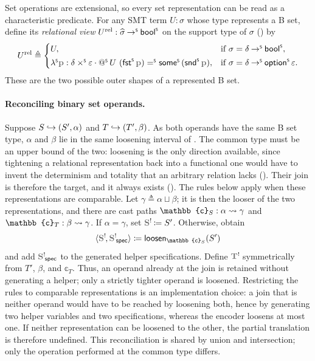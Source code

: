 Set operations are extensional, so every set representation can be read as a characteristic predicate.
For any SMT term \(U : \sigma\) whose type represents a B set, define its \emph{relational view} \(U^{\mathrm{rel}} : \widehat{\sigma}\mathbin{\to^{\scriptscriptstyle{\mathsf{S}}}}\mathsf{bool}^{\scriptscriptstyle{\mathsf{S}}}\) on the support type of \(\sigma\) () by
\[
  U^{\mathrm{rel}}
  \triangleq
  \begin{cases}
    U,
      & \text{if } \sigma=\delta\toS\boolS, \\[2pt]
    \lamS \var{p}:\delta\timesS\varepsilon\cdot
      \appS{U}{(\fstS \var{p})}\eqS\someS(\sndS \var{p}),
      & \text{if } \sigma=\delta\toS\optS\varepsilon.
  \end{cases}
\]
These are the two possible outer shapes of a represented B set.

\paragraph{Reconciling binary set operands.}
Suppose \(S \mathrel{\hookrightarrow} (S', \alpha)\) and \(T \mathrel{\hookrightarrow} (T', \beta)\).
As both operands have the same B set type, \(\alpha\) and \(\beta\) lie in the same loosening interval of .
The common type must be an upper bound of the two: loosening is the only direction available, since tightening a relational representation back into a functional one would have to invent the determinism and totality that an arbitrary relation lacks ().
Their join is therefore the target, and it always exists ().
The rules below apply when these representations are comparable.
Let \(\gamma \triangleq \alpha \sqcup \beta\); it is then the looser of the two representations, and there are cast paths \(\mathbb{c}_S : \castpath{\alpha}{\gamma}\) and \(\mathbb{c}_T : \castpath{\beta}{\gamma}\).
If \(\alpha=\gamma\), set \(\lvar{S}\coloneq S'\).
Otherwise, obtain
\[
  \langle\lvar{S},\spec{\lvar{S}}\rangle
    \coloneq \mathsf{loosen}_{\mathbb{c}_S}(S')
\]
and add \(\spec{\lvar{S}}\) to the generated helper specifications.
Define \(\lvar{T}\) symmetrically from \(T'\), \(\beta\), and \(\mathbb{c}_T\).
Thus, an operand already at the join is retained without generating a helper; only a strictly tighter operand is loosened.
Restricting the rules to comparable representations is an implementation choice: a join that is neither operand would have to be reached by loosening both, hence by generating two helper variables and two specifications, whereas the encoder loosens at most one.
If neither representation can be loosened to the other, the partial translation is therefore undefined.
This reconciliation is shared by union and intersection; only the operation performed at the common type differs.

